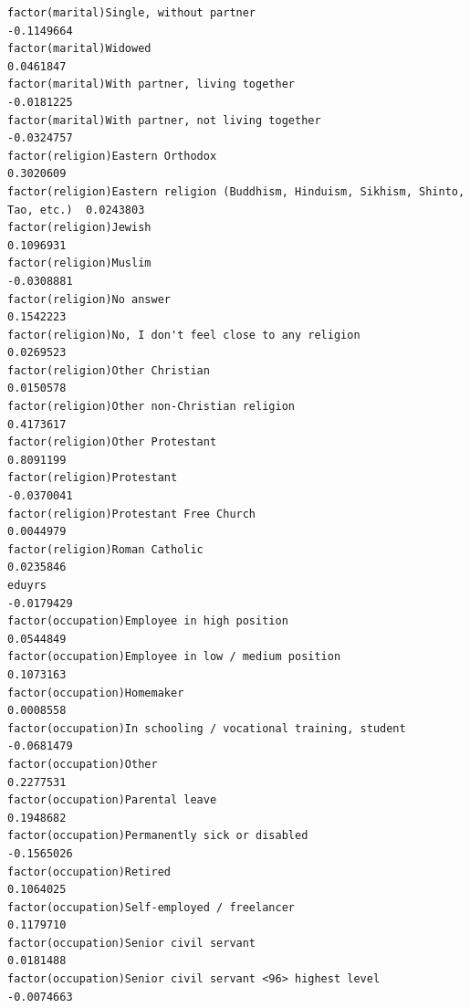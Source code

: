 \documentclass[
]{article}
\begin{document}
\begin{table}
\begin{minipage}[t]{\linewidth}
{\begin{verbatim}
factor(marital)Single, without partner                                            -0.1149664
factor(marital)Widowed                                                             0.0461847
factor(marital)With partner, living together                                      -0.0181225
factor(marital)With partner, not living together                                  -0.0324757
factor(religion)Eastern Orthodox                                                   0.3020609
factor(religion)Eastern religion (Buddhism, Hinduism, Sikhism, Shinto, Tao, etc.)  0.0243803
factor(religion)Jewish                                                             0.1096931
factor(religion)Muslim                                                            -0.0308881
factor(religion)No answer                                                          0.1542223
factor(religion)No, I don't feel close to any religion                             0.0269523
factor(religion)Other Christian                                                    0.0150578
factor(religion)Other non-Christian religion                                       0.4173617
factor(religion)Other Protestant                                                   0.8091199
factor(religion)Protestant                                                        -0.0370041
factor(religion)Protestant Free Church                                             0.0044979
factor(religion)Roman Catholic                                                     0.0235846
eduyrs                                                                            -0.0179429
factor(occupation)Employee in high position                                        0.0544849
factor(occupation)Employee in low / medium position                                0.1073163
factor(occupation)Homemaker                                                        0.0008558
factor(occupation)In schooling / vocational training, student                     -0.0681479
factor(occupation)Other                                                            0.2277531
factor(occupation)Parental leave                                                   0.1948682
factor(occupation)Permanently sick or disabled                                    -0.1565026
factor(occupation)Retired                                                          0.1064025
factor(occupation)Self-employed / freelancer                                       0.1179710
factor(occupation)Senior civil servant                                             0.0181488
factor(occupation)Senior civil servant <96> highest level                         -0.0074663

\end{verbatim}}
\end{minipage}
\end{table}
\end{document}
